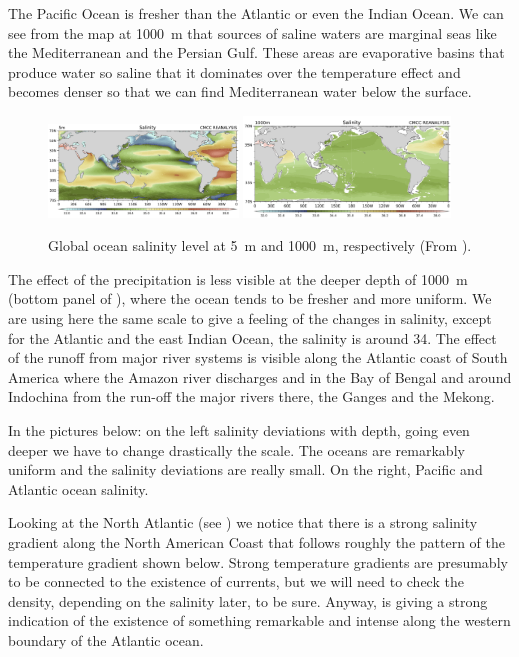 The Pacific Ocean is fresher than the Atlantic or even the Indian Ocean.
We can see from the map at \qty{1000}{m} that sources of saline waters are
marginal seas like the Mediterranean and the Persian Gulf. These areas
are evaporative basins that produce water so saline that it dominates
over the temperature effect and becomes denser so that we can find
Mediterranean water below the surface.

\begin{figure}
	\centering
	\includegraphics[width=0.45\textwidth]{figs/ocean-salinity5m}
	\hfill
	\includegraphics[width=0.49\textwidth]{figs/ocean-salinity1000m}
	\caption{Global ocean salinity level at \qty{5}{\meter} and \qty{1000}{m}, respectively (From \CMCCreanalysis).}
	\label{fig:ocean-salinity}
\end{figure}

The effect of the precipitation is less visible at the deeper depth of \qty{1000}{\meter} (bottom panel of \fig{\ref{fig:ocean-salinity}}), where the ocean tends to be fresher and more
uniform. We are using here the same scale to give a feeling of the
changes in salinity, except for the Atlantic and the east Indian Ocean,
the salinity is around \qty{34}{\psu}.
The effect of the runoff from major river systems is visible along the
Atlantic coast of South America where the Amazon river discharges and in the Bay of Bengal and around Indochina from the run-off the major rivers there, the Ganges and the Mekong.


In the pictures below: on the left salinity deviations with depth, going even deeper we have to change drastically
the scale. The oceans are remarkably uniform and the salinity deviations are really small. On the right, Pacific and Atlantic ocean salinity.



Looking at the North Atlantic (see \fig{\ref{fig:salinity-different-detphs-cmcc}}) we notice that
there is a strong salinity gradient along the North American Coast that
follows roughly the pattern of the temperature gradient shown below. Strong temperature gradients are presumably to be
connected to the existence of currents, but we will need to check the
density, depending on the salinity later, to be sure.
Anyway, \fig{\ref{fig:salinity-different-detphs-cmcc}} is giving a strong indication of the existence of something
remarkable and intense along the western boundary of the Atlantic ocean.

